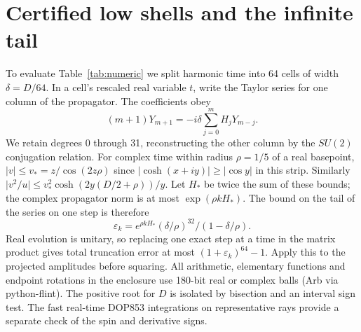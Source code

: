 \section{Certified low shells and the infinite tail}\label{app:A}
To evaluate Table~\ref{tab:numeric} we split harmonic time into 64 cells of width $\delta=D/64$. In a cell's rescaled real variable $t$, write the Taylor series for one column of the propagator. The coefficients obey
\[
 (m+1)Y_{m+1}=-i\delta\sum_{j=0}^m H_jY_{m-j}.
\]
We retain degrees 0 through 31, reconstructing the other column by the $SU(2)$ conjugation relation. For complex time within radius $\rho=1/5$ of a real basepoint, $\lvert v\rvert\le v_* = z/\cos(2z\rho)$ since $\lvert\cosh(x+iy)\rvert\ge|\cos y|$ in this strip. Similarly $\lvert v^2/u\rvert\le v_*^2\cosh(2y(D/2+\rho))/y$. Let $H_*$ be twice the sum of these bounds; the complex propagator norm is at most $\exp(\rho kH_*)$. The bound on the tail of the series on one step is therefore
\[
 \varepsilon_k=e^{\rho kH_*}(\delta/\rho)^{32}/(1-\delta/\rho).
\]
Real evolution is unitary, so replacing one exact step at a time in the matrix product gives total truncation error at most $(1+\varepsilon_k)^{64}-1$. Apply this to the projected amplitudes before squaring. All arithmetic, elementary functions and endpoint rotations in the enclosure use 180-bit real or complex balls (Arb via python-flint). The positive root for $D$ is isolated by bisection and an interval sign test. The fast real-time DOP853 integrations on representative rays provide a separate check of the spin and derivative signs.

